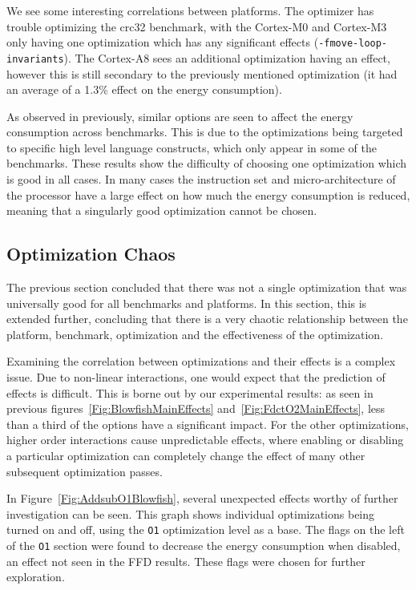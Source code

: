 \documentclass[twocolumn]{article}
\begin{document}
We see some interesting correlations between platforms. The optimizer has trouble optimizing the crc32 benchmark, with the Cortex-M0 and Cortex-M3 only having one optimization which has any significant effects (\texttt{-fmove-loop-invariants}). The Cortex-A8 sees an additional optimization having an effect, however this is still secondary to the previously mentioned optimization (it had an average of a 1.3\% effect on the energy consumption).

As observed in previously, similar options are seen to affect the energy consumption across benchmarks. This is due to the optimizations being targeted to specific high level language constructs, which only appear in some of the benchmarks. These results show the difficulty of choosing one optimization which is good in all cases. In many cases the instruction set and micro-architecture of the processor have a large effect on how much the energy consumption is reduced, meaning that a singularly good optimization cannot be chosen.

\subsection{Optimization Chaos}

The previous section concluded that there was not a single optimization that was universally good for all benchmarks and platforms. In this section, this is extended further, concluding that there is a very chaotic relationship between the platform, benchmark, optimization and the effectiveness of the optimization.

Examining the correlation between optimizations and their effects is a complex issue. Due to non-linear interactions, one would expect that the prediction of effects is difficult. This is borne out by our experimental results: as seen in previous figures~\ref{Fig:BlowfishMainEffects} and~\ref{Fig:FdctO2MainEffects}, less than a third of the options have a significant impact. For the other optimizations, higher order interactions cause unpredictable effects, where enabling or disabling a particular optimization can completely change the effect of many other subsequent optimization passes.

In Figure~\ref{Fig:AddsubO1Blowfish}, several unexpected effects worthy of further investigation can be seen. This graph shows individual optimizations being turned on and off, using the \texttt{O1} optimization level as a base. The flags on the left of the \texttt{O1} section were found to decrease the energy consumption when disabled, an effect not seen in the FFD results. These flags were chosen for further exploration.
\end{document}
